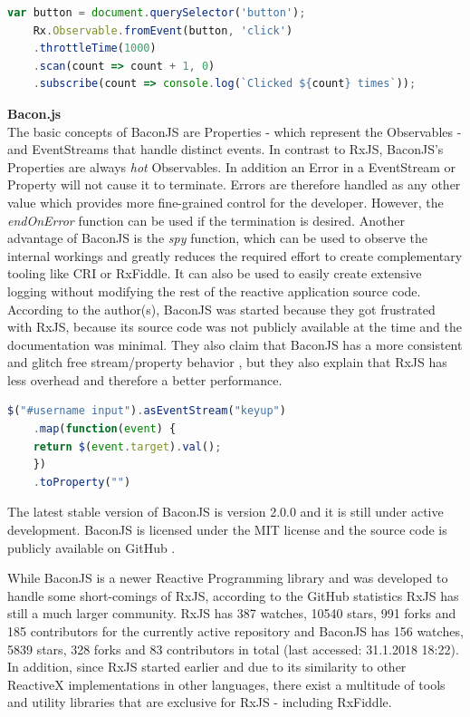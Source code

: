 	\begin{lstlisting}[language=JavaScript, caption={Example of RxJS code.},label={lst:Rx}]
	var button = document.querySelector('button');
	Rx.Observable.fromEvent(button, 'click')
	.throttleTime(1000)
	.scan(count => count + 1, 0)
	.subscribe(count => console.log(`Clicked ${count} times`));
	\end{lstlisting}
	
	\textbf{Bacon.js}\\
	The basic concepts of BaconJS \cite{BaconJS} are Properties - which represent the Observables - and EventStreams that handle distinct events. 
	In contrast to RxJS, BaconJS's Properties are always \emph{hot} Observables. In addition an Error in a EventStream or Property will not cause it to terminate. Errors are therefore handled as any other value which provides more fine-grained control for the developer. However, the \emph{endOnError} function can be used if the termination is desired. 
	Another advantage of BaconJS is the \emph{spy} function, which can be used to observe the internal workings and greatly reduces the required effort to create complementary tooling like CRI or RxFiddle. It can also be used to easily create extensive logging without modifying the rest of the reactive application source code. According to the author(s), BaconJS was started because they got frustrated with RxJS, because its source code was not publicly available at the time and the documentation was minimal. They also claim that BaconJS has a more consistent and glitch free stream/property behavior \cite{BaconJSRepo}, but they also explain that RxJS has less overhead and therefore a better performance. 
		\begin{lstlisting}[language=JavaScript, caption={Example of BaconJS code.},label={lst:Bacon}]
	$("#username input").asEventStream("keyup")
	.map(function(event) {
	return $(event.target).val();
	})
	.toProperty("")
	\end{lstlisting}
	The latest stable version of BaconJS is version 2.0.0 and it is still under active development. BaconJS is licensed under the MIT license and the source code is publicly available on GitHub \cite{BaconJSRepo}.

	While BaconJS is a newer Reactive Programming library and was developed to handle some short-comings of RxJS, according to the GitHub statistics RxJS has still a much larger community. RxJS has 387 watches, 10540 stars, 991 forks and 185 contributors for the currently active repository and BaconJS has 156 watches, 5839 stars, 328 forks and 83 contributors in total (last accessed: 31.1.2018 18:22).
	In addition, since RxJS started earlier and due to its similarity to other ReactiveX implementations in other languages, there exist a multitude of tools and utility libraries that are exclusive for RxJS - including RxFiddle.

